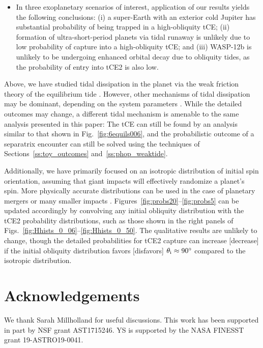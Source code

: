 \documentclass[
        fleqn,
        usenatbib,
        referee,
    ]{mnras}
\begin{document}
\begin{itemize}
    \item In three exoplanetary scenarios of interest, application of our
        results yields the following conclusions: (i) a super-Earth with an
        exterior cold Jupiter has substantial probability of being trapped in a
        high-obliquity tCE\@; (ii) formation of ultra-short-period planets via
        tidal runaway is unlikely due to low probability of capture into a
        high-obliquity tCE\@; and (iii) WASP-12b is unlikely to be undergoing
        enhanced orbital decay due to obliquity tides, as the probability of
        entry into tCE2 is also low.
\end{itemize}

Above, we have studied tidal dissipation in the planet via the weak friction
theory of the equilibrium tide \citep{lai2012}. However, other mechanisms of
tidal dissipation may be dominant, depending on the system parameters
\citep[e.g.][]{papaloizou_ivanov_inertial, teyssandier2019formation}. While the
detailed outcomes may change, a different tidal mechanism is amenable to the
same analysis presented in this paper: The tCE can still be found by an analysis
similar to that shown in Fig.~\ref{fig:6equils006}, and the probabilistic
outcome of a separatrix encounter can still be solved using the techniques of
Sections~\ref{ss:toy_outcomes} and~\ref{ss:phop_weaktide}.

Additionally, we have primarily focused on an isotropic distribution of initial
spin orientation, assuming that giant impacts will effectively randomize a
planet's spin. More physically accurate distributions can be used in the case of
planetary mergers \citep{li2020planetary} or many smaller impacts
\citep{dones1993does}. Figures~\ref{fig:probs20}--\ref{fig:probs5} can be
updated accordingly by convolving any initial obliquity distribution with the
tCE2 probability distributions, such as those shown in the right panels of
Figs.~\ref{fig:Hhists_0_06}--\ref{fig:Hhists_0_50}. The qualitative results are
unlikely to change, though the detailed probabilities for tCE2 capture can
increase [decrease] if the initial obliquity distribution favors [disfavors]
$\theta_{\rm i} \approx 90^\circ$ compared to the isotropic distribution.

\section{Acknowledgements}

We thank Sarah Millholland for useful discussions. This work has been supported
in part by NSF grant AST1715246. YS is supported by the NASA FINESST grant
19-ASTRO19-0041.%
\end{document}
